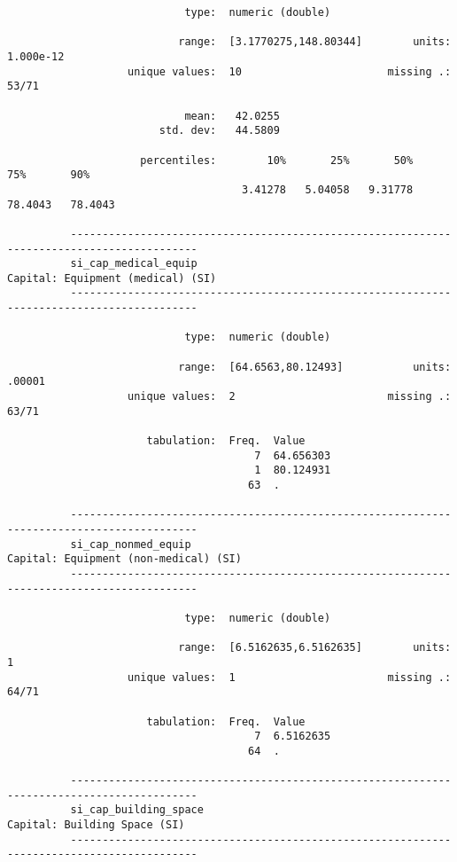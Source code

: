\documentclass{article}
\begin{document}
\begin{verbatim}
                            type:  numeric (double)
          
                           range:  [3.1770275,148.80344]        units:  1.000e-12
                   unique values:  10                       missing .:  53/71
          
                            mean:   42.0255
                        std. dev:   44.5809
          
                     percentiles:        10%       25%       50%       75%       90%
                                     3.41278   5.04058   9.31778   78.4043   78.4043
          
          ------------------------------------------------------------------------------------------
          si_cap_medical_equip                                     Capital: Equipment (medical) (SI)
          ------------------------------------------------------------------------------------------
          
                            type:  numeric (double)
          
                           range:  [64.6563,80.12493]           units:  .00001
                   unique values:  2                        missing .:  63/71
          
                      tabulation:  Freq.  Value
                                       7  64.656303
                                       1  80.124931
                                      63  .
          
          ------------------------------------------------------------------------------------------
          si_cap_nonmed_equip                                  Capital: Equipment (non-medical) (SI)
          ------------------------------------------------------------------------------------------
          
                            type:  numeric (double)
          
                           range:  [6.5162635,6.5162635]        units:  1
                   unique values:  1                        missing .:  64/71
          
                      tabulation:  Freq.  Value
                                       7  6.5162635
                                      64  .
          
          ------------------------------------------------------------------------------------------
          si_cap_building_space                                         Capital: Building Space (SI)
          ------------------------------------------------------------------------------------------
          

\end{verbatim}
\end{document}
